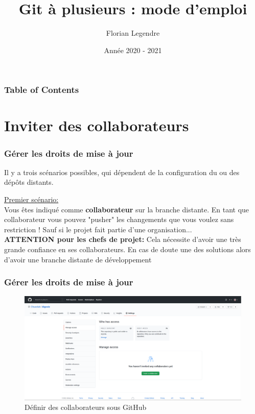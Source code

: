 \documentclass{beamer}
\title[Git collaboratif]{Git à plusieurs : mode d'emploi}
\author{Florian Legendre}
\institute{Université de Poitiers}
\date{Année 2020 - 2021}
\begin{document}
\frame{\titlepage}

\begin{frame}
\frametitle{Table of Contents}
\tableofcontents[hideallsubsections]
\end{frame}


\section{Inviter des collaborateurs}

\begin{frame}
\frametitle{Gérer les droits de mise à jour}
Il y a trois scénarios possibles, qui dépendent de la configuration du ou des dépôts distants.
\medskip

\underline{Premier scénario:}\\
\smallskip
Vous êtes indiqué comme \textbf{collaborateur} sur la branche distante. En tant que collaborateur vous pouvez "pusher" les changements que vous voulez sans restriction ! Sauf si le projet fait partie d'une organisation...\\
\medskip
\textbf{ATTENTION pour les chefs de projet:} Cela nécessite d'avoir une très grande confiance en ses collaborateurs. En cas de doute une des solutions alors d'avoir une branche distante de développement
\end{frame}

\begin{frame}
\frametitle{Gérer les droits de mise à jour}

\begin{center}
\begin{figure}[h!]
    \includegraphics[scale=0.15]{images/droits_push/collaborator.png}
    \caption{Définir des collaborateurs sous GitHub}
\end{figure}
\end{center}

\end{frame}
\end{document}
